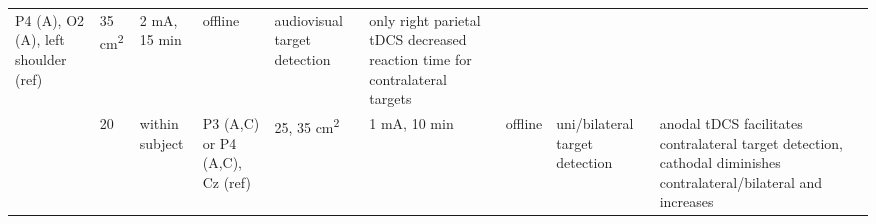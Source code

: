 \documentclass[11pt,english,]{memoir}
\begin{document}
\begin{longtable}[]{@{}lllllllll@{}}
\begin{minipage}[t]{0.11\columnwidth}
P4 (A), O2 (A), left
shoulder (ref)\strut
\end{minipage} & \begin{minipage}[t]{0.03\columnwidth}\raggedright
35
cm\textsuperscript{2}\strut
\end{minipage} & \begin{minipage}[t]{0.05\columnwidth}\raggedright
2 mA, 15
min\strut
\end{minipage} & \begin{minipage}[t]{0.05\columnwidth}\raggedright
offline\strut
\end{minipage} & \begin{minipage}[t]{0.11\columnwidth}\raggedright
audiovisual target
detection\strut
\end{minipage} & \begin{minipage}[t]{0.24\columnwidth}\raggedright
only right parietal tDCS decreased reaction time for
contralateral targets\strut
\end{minipage}\tabularnewline
\begin{minipage}[t]{0.12\columnwidth}\raggedright
\textcite{Sparing2009}\strut
\end{minipage} & \begin{minipage}[t]{0.02\columnwidth}\raggedright
20\strut
\end{minipage} & \begin{minipage}[t]{0.04\columnwidth}\raggedright
within
subject\strut
\end{minipage} & \begin{minipage}[t]{0.11\columnwidth}\raggedright
P3 (A,C) or P4 (A,C), Cz
(ref)\strut
\end{minipage} & \begin{minipage}[t]{0.03\columnwidth}\raggedright
25,
35
cm\textsuperscript{2}\strut
\end{minipage} & \begin{minipage}[t]{0.05\columnwidth}\raggedright
1 mA, 10
min\strut
\end{minipage} & \begin{minipage}[t]{0.05\columnwidth}\raggedright
offline\strut
\end{minipage} & \begin{minipage}[t]{0.11\columnwidth}\raggedright
uni/bilateral target
detection\strut
\end{minipage} & \begin{minipage}[t]{0.24\columnwidth}\raggedright
anodal tDCS facilitates contralateral target detection,
cathodal diminishes contralateral/bilateral and increases

\end{minipage}
\end{longtable}
\end{document}
